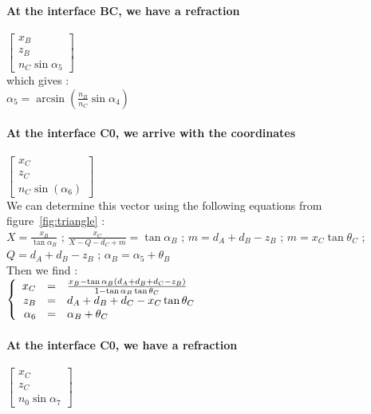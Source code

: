 \paragraph*{At the interface BC, we have a refraction}
$\begin{bmatrix}x_B \\ z_B \\ n_C\sin\alpha_5\end{bmatrix}$\\

which gives :\\

$\alpha_5 = \arcsin\left(\frac{n_B}{n_C}\sin\alpha_4\right) $


\paragraph*{At the interface C0, we arrive with the coordinates}

$\begin{bmatrix}x_C \\ z_C \\ n_C\sin\left(\alpha_6\right)\end{bmatrix}$\\

We can determine this vector using the following equations from figure~\ref{fig:triangle} :\\

$X = \frac{x_B}{\tan\alpha_B}$ ; $\frac{x_C}{X-Q-d_C+m} = \tan\alpha_B$ ; $m = d_A+d_B-z_B$ ; $m = x_C\tan\theta_C$ ; $Q = d_A+d_B-z_B$ ; $\alpha_B = \alpha_5+\theta_B$\\

Then we find :\\
$\left \{
   \begin{array}{r c l}
      x_C  & = & \frac{x_B-\tan\alpha_B\left(d_A+d_B+d_C-z_B\right)}{1-\tan\alpha_B\tan\theta_C} \\
      z_B   & = & d_A+d_B+d_C-x_C\tan\theta_C \\
      \alpha_6 & = & \alpha_B+\theta_C
   \end{array}
\right.$

\paragraph*{At the interface C0, we have a refraction}
$\begin{bmatrix}x_C \\ z_C \\ n_0\sin\alpha_7\end{bmatrix}$\\

